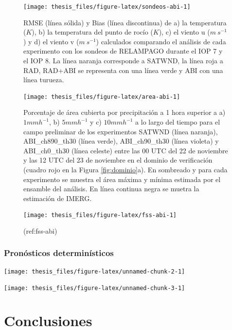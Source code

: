 \documentclass[12pt,oneside]{reedthesis}
\begin{document}
\begin{figure}

{\centering \texttt{[image: thesis\_files/figure-latex/sondeos-abi-1]} 

}

\caption{RMSE (línea sólida) y Bias (línea discontinua) de a) la temperatura (\(K\)), b) la temperatura del punto de rocío (\(K\)), c) el viento u (\(m\ s^{-1}\)) y d) el viento v (\(m\ s^{-1}\)) calculados comparando el análisis de cada experimento con los sondeos de RELAMPAGO durante el IOP 7 y el IOP 8. La línea naranja corresponde a SATWND, la línea roja a RAD, RAD+ABI se representa con una línea verde y ABI con una línea turueza.}\label{fig:sondeos-abi}
\end{figure}
\begin{figure}
\texttt{[image: thesis\_files/figure-latex/area-abi-1]} \caption{Porcentaje de área cubierta por precipitación a 1 hora superior a a) \(1 mmh^{-1}\), b) \(5 mmh^{-1}\) y c) \(10 mmh^{-1}\) a lo largo del tiempo para el campo preliminar de los experimentos SATWND (línea naranja), ABI\_ch890\_th30 (línea verde), ABI\_ch90\_th30 (línea violeta) y ABI\_ch0\_th30 (línea celeste) entre las 00 UTC del 22 de noviembre y las 12 UTC del 23 de noviembre en el dominio de verificación (cuadro rojo en la Figura \ref{fig:dominio}a). En sombreado y para cada experimento se muestra el área máxima y mínima estimada por el ensamble del análisis. En línea continua negra se muetra la estimación de IMERG.}\label{fig:area-abi}
\end{figure}
\begin{figure}
\texttt{[image: thesis\_files/figure-latex/fss-abi-1]} \caption{(ref:fss-abi)}\label{fig:fss-abi}
\end{figure}
\hypertarget{pronuxf3sticos-determinuxedsticos}{%
\subsubsection{Pronósticos determinísticos}\label{pronuxf3sticos-determinuxedsticos}}

\texttt{[image: thesis\_files/figure-latex/unnamed-chunk-2-1]}

\texttt{[image: thesis\_files/figure-latex/unnamed-chunk-3-1]}

\hypertarget{conclusiones-2}{%
\section{Conclusiones}\label{conclusiones-2}}
\end{document}
